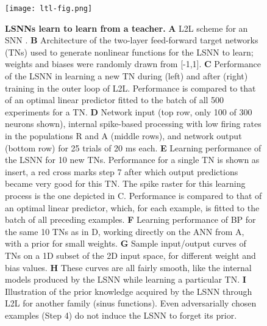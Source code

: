 \documentclass{article} \pdfoutput=1
\begin{document}
\begin{figure}[p]
	\texttt{[image: ltl-fig.png]}
\caption{
		\label{fig:ltl} \textbf{LSNNs learn to learn from a teacher.} 
        \textbf{A} L2L scheme for an SNN .
		\textbf{B} Architecture of the two-layer feed-forward target networks (TNs) used to generate nonlinear functions for the LSNN to learn; weights and biases were randomly drawn from [-1,1].
        \textbf{C} Performance of the LSNN in learning a new TN during (left) and after (right) training in the outer loop of L2L. Performance is compared to that of an optimal linear predictor fitted to the batch of all 500 experiments for a TN.
\textbf{D} Network input (top row, only 100 of 300 neurons shown),
		internal spike-based processing with low firing rates in the populations R and A (middle rows), and network output (bottom row) for 25 trials of 20 ms each. 
\textbf{E} Learning performance of the LSNN for 10 new TNs. Performance for a single TN is shown as insert, a red cross marks step 7 after which output predictions became very good for this TN. The spike raster for this learning process is the one depicted in C. Performance is compared to that of an optimal linear predictor, which, for each example, is fitted to the batch of all preceding examples.
\textbf{F} Learning performance of BP for the same 10 TNs as in D, working directly on the ANN from A, with a prior for small weights. 
\textbf{G} Sample input/output curves of TNs on a 1D subset of the 2D input space, for different weight and bias values.
		\textbf{H} These curves are all fairly smooth, like the internal models produced by the LSNN while learning a particular TN.
		\textbf{I} Illustration of the prior knowledge acquired by the LSNN through L2L for another family  (sinus functions). Even adversarially chosen examples (Step 4) do not induce the LSNN to forget its prior.
} 
\end{figure}
\end{document}
